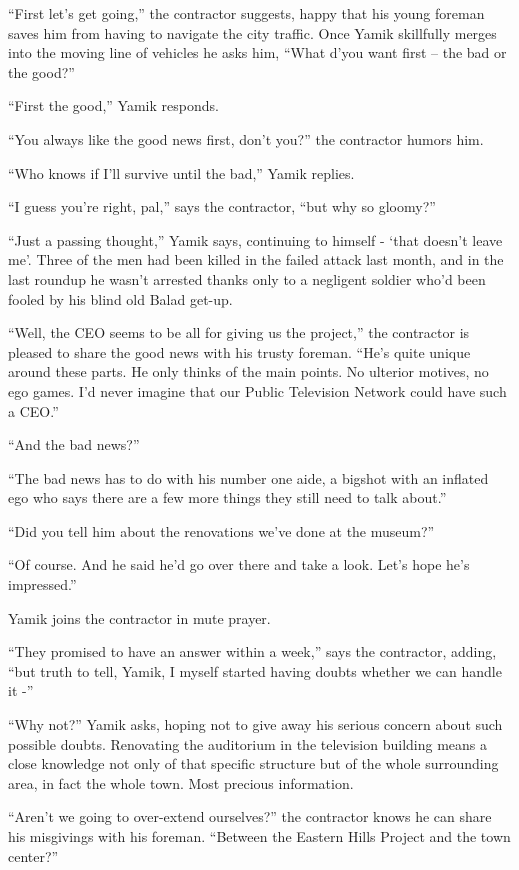 \documentclass[twoside,11pt]{book}
\begin{document}
``First let's get going,'' the contractor suggests, happy that his young foreman saves him
from having to navigate the city traffic. Once Yamik skillfully merges into the moving line of vehicles he asks him,
``What d'you want first -- the bad or the good?''

``First the good,'' Yamik responds.

``You always like the good news first, don't you?'' the contractor humors him.

``Who knows if I'll survive until the bad,'' Yamik replies.

``I guess you're right, pal,'' says the contractor, ``but why so
gloomy?''

``Just a passing thought,'' Yamik says, continuing to himself - `that doesn't leave me'. Three
of the men had been killed in the failed attack last month, and in the last roundup he wasn't arrested thanks only to a
negligent soldier who'd been fooled by his blind old Balad get-up.

``Well, the CEO seems to be all for giving us the project,'' the contractor is pleased to
share the good news with his trusty foreman. ``He's quite unique around these parts. He only thinks of
the main points. No ulterior motives, no ego games. I'd never imagine that our Public Television Network could have
such a CEO.''

``And the bad news?''

``The bad news has to do with his number one aide, a bigshot with an inflated ego who says there are a few
more things they still need to talk about.''

``Did you tell him about the renovations we've done at the museum?''

``Of course. And he said he'd go over there and take a look. Let's hope he's impressed.''

Yamik joins the contractor in mute prayer.

``They promised to have an answer within a week,'' says the contractor,
adding, ``but truth to tell, Yamik, I myself started having doubts whether we can handle it
-''

``Why not?'' Yamik asks, hoping not to give away his serious concern about
such possible doubts. Renovating the auditorium in the television building means a close knowledge not only of that
specific structure but of the whole surrounding area, in fact the whole town. Most precious information.

``Aren't we going to over-extend ourselves?'' the contractor knows he can share his misgivings
with his foreman. ``Between the Eastern Hills Project and the town center?''
\end{document}
